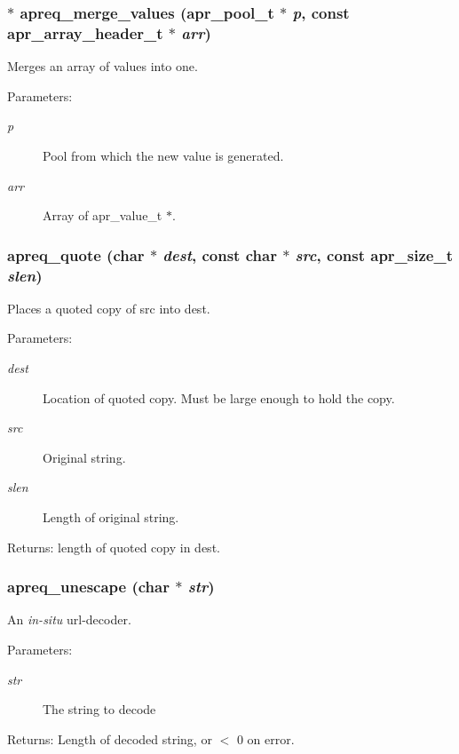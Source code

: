 \subsubsection{$\ast$ apreq\_\-merge\_\-values ({\bf apr\_\-pool\_\-t} $\ast$ {\em p}, const {\bf apr\_\-array\_\-header\_\-t} $\ast$ {\em arr})}\label{group__Utils_a5}


Merges an array of values into one. \begin{Desc}
\item[Parameters:]
\begin{description}
\item[{\em p}]Pool from which the new value is generated. \item[{\em arr}]Array of apr\_\-value\_\-t $\ast$. \end{description}
\end{Desc}
\subsubsection{ apreq\_\-quote (char $\ast$ {\em dest}, const char $\ast$ {\em src}, const {\bf apr\_\-size\_\-t} {\em slen})}\label{group__Utils_a10}


Places a quoted copy of src into dest. \begin{Desc}
\item[Parameters:]
\begin{description}
\item[{\em dest}]Location of quoted copy. Must be large enough to hold the copy. \item[{\em src}]Original string. \item[{\em slen}]Length of original string. \end{description}
\end{Desc}
\begin{Desc}
\item[Returns:]length of quoted copy in dest. \end{Desc}
\subsubsection{ apreq\_\-unescape (char $\ast$ {\em str})}\label{group__Utils_a14}


An {\em in-situ\/} url-decoder. \begin{Desc}
\item[Parameters:]
\begin{description}
\item[{\em str}]The string to decode \end{description}
\end{Desc}
\begin{Desc}
\item[Returns:]Length of decoded string, or $<$ 0 on error. \end{Desc}
